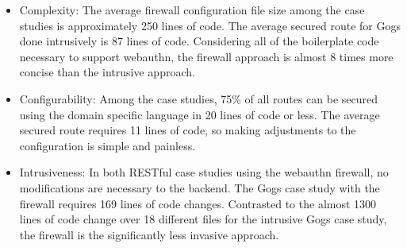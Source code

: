 \begin{itemize}[nosep]
\item Complexity: The average firewall configuration file size among the case studies is approximately 250 lines of code. The average secured route for Gogs done intrusively is 87 lines of code. Considering all of the boilerplate code necessary to support webauthn, the firewall approach is almost 8 times more concise than the intrusive approach.





\item Configurability: Among the case studies, 75\% of all routes can be secured using the domain specific language in 20 lines of code or less. The average secured route requires 11 lines of code, so making adjustments to the configuration is simple and painless. 


\item Intrusiveness: In both RESTful case studies using the webauthn firewall, no modifications are necessary to the backend. The Gogs case study with the firewall requires 169 lines of code changes. Contrasted to the almost 1300 lines of code change over 18 different files for the intrusive Gogs case study, the firewall is the significantly less invasive approach.


\end{itemize}

